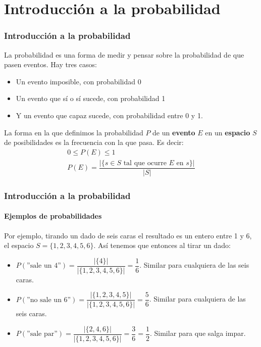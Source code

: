 \documentclass[../main.tex]{subfiles}
\begin{document}
\newcommand{\SECTIONA}{Introducción a la probabilidad}
\section{\SECTIONA}

\begin{frame}
  \frametitle{\SECTIONA}

  La probabilidad es una forma de medir y pensar sobre la probabilidad de que pasen eventos. \pause Hay tres casos:
  \begin{itemize}
    \item<2-> Un evento imposible, con probabilidad 0
    \item<3-> Un evento que sí o sí sucede, con probabilidad 1
    \item<4-> Y un evento que capaz sucede, con probabilidad entre 0 y 1.
  \end{itemize} \pause \pause \pause %
  La forma en la que definimos la probabilidad \(P\) de un \textbf{evento} \(E\) en un \textbf{espacio} \(S\) de posibilidades es la frecuencia con la que pasa. Es decir:
  \begin{gather*}
    0 \leq P(E) \leq 1 \\
    P(E) = \dfrac{|\{s \in S \text{ tal que ocurre } E \text{ en } s\}|}{|S|}
  \end{gather*}
\end{frame}

\begin{frame}
  \frametitle{\SECTIONA}
  \framesubtitle{Ejemplos de probabilidades}

  Por ejemplo, tirando un dado de seis caras el resultado es un entero entre 1 y 6, el espacio \(S = \{1, 2, 3, 4, 5, 6\}\). \pause Así tenemos que entonces al tirar un dado:
  \begin{itemize}
    \item<2-> \(P(\text{''sale un 4''}) = \dfrac{|\{4\}|}{|\{1, 2, 3, 4, 5, 6\}|} = \dfrac{1}{6}\). Similar para cualquiera de las seis caras.
    \item<3-> \(P(\text{''no sale un 6''}) = \dfrac{|\{1, 2, 3, 4, 5\}|}{|\{1, 2, 3, 4, 5, 6\}|} = \dfrac{5}{6}\). Similar para cualquiera de las seis caras.
    \item<4-> \(P(\text{''sale par''}) = \dfrac{|\{2, 4, 6\}|}{|\{1, 2, 3, 4, 5, 6\}|} = \dfrac{3}{6} = \dfrac{1}{2}\). Similar para que salga impar.
  \end{itemize}
\end{frame}
\end{document}

